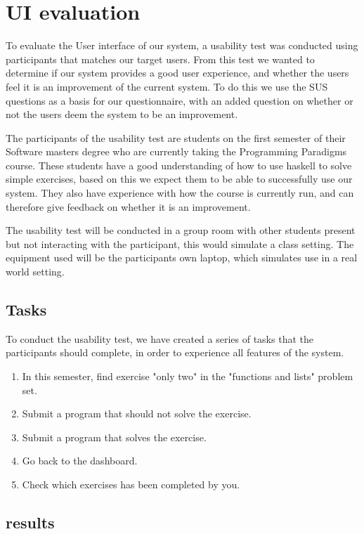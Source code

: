 \section{UI evaluation}
To evaluate the User interface of our system, a usability test was conducted using participants that matches our target users. From this test we wanted to determine if our system provides a good user experience, and whether the users feel it is an improvement of the current system.
To do this we use the SUS questions as a basis for our questionnaire, with an added question on whether or not the users deem the system to be an improvement.

The participants of the usability test are students on the first semester of their Software masters degree who are currently taking the Programming Paradigms course. 
These students have a good understanding of how to use haskell to solve simple exercises, based on this we expect them to be able to successfully use our system. They also have experience with how the course is currently run, and can therefore give feedback on whether it is an improvement.

The usability test will be conducted in a group room with other students present but not interacting with the participant, this would simulate a class setting. 
The equipment used will be the participants own laptop, which simulates use in a real world setting.

\subsection*{Tasks}
To conduct the usability test, we have created a series of tasks that the participants should complete, in order to experience all features of the system.

\begin{enumerate}
    \item In this semester, find exercise "only two" in the "functions and lists" problem set.
    \item Submit a program that should not solve the exercise.
    \item Submit a program that solves the exercise.
    \item Go back to the dashboard.
    \item Check which exercises has been completed by you.
\end{enumerate}



\subsection*{results}
